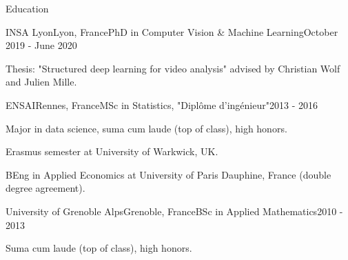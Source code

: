 \documentclass{resume} %
\begin{document}

\begin{rSection}{Education}
     \begin{rSubsection}{INSA Lyon}{Lyon, France}{PhD in Computer Vision \& Machine Learning}{October 2019 - June 2020}
            \item Thesis: "Structured deep learning for video analysis" advised by Christian Wolf and Julien Mille.
    \end{rSubsection}
    \begin{rSubsection}{ENSAI}{Rennes, France}{MSc in Statistics, "Diplôme d'ingénieur"}{2013 - 2016}
            \item Major in data science, suma cum laude (top of class), high honors.
            \item Erasmus semester at University of Warkwick, UK.
            \item BEng in Applied Economics at University of Paris Dauphine, France (double degree agreement).
    \end{rSubsection}
    \begin{rSubsection}{University of Grenoble Alps}{Grenoble, France}{BSc in Applied Mathematics}{2010 - 2013}
            \item Suma cum laude (top of class), high honors.
    \end{rSubsection}
\end{rSection}
\end{document}
